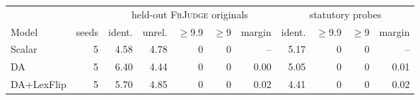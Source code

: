 \setlength{\tabcolsep}{3pt}
\begin{tabular}{lrrrrrrrrrr}
\toprule
& & \multicolumn{5}{c}{held-out \textsc{FrJudge} originals} & \multicolumn{4}{c}{statutory probes} \\
\cmidrule(lr){3-7}\cmidrule(lr){8-11}
Model & seeds & ident. & unrel. & $\geq$9.9 & $\geq$9 & margin & ident. & $\geq$9.9 & $\geq$9 & margin \\
\midrule
Scalar & 5 & 4.58 & 4.78 & 0 & 0 & -- & 5.17 & 0 & 0 & -- \\
DA & 5 & 6.40 & 4.44 & 0 & 0 & 0.00 & 5.05 & 0 & 0 & 0.01 \\
DA+LexFlip & 5 & 5.70 & 4.85 & 0 & 0 & 0.02 & 4.41 & 0 & 0 & 0.02 \\
\bottomrule
\end{tabular}
